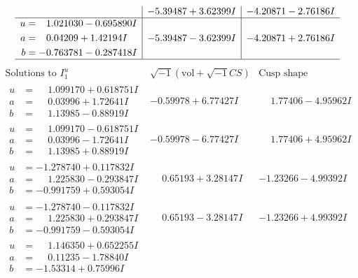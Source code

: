 \documentclass[1p]{elsarticle_modified}
\theoremstyle{definition}
\newcommand{\I}{\sqrt{-1}}
\begin{document}
$$\begin{array}{c|c|c}
 & -5.39487 + 3.62399 I & -4.20871 - 2.76186 I \\ \hline\begin{aligned}
u &= \phantom{-}1.021030 - 0.695890 I \\
a &= \phantom{-}0.04209 + 1.42194 I \\
b &= -0.763781 - 0.287418 I\end{aligned}
 & -5.39487 - 3.62399 I & -4.20871 + 2.76186 I\\
 \hline 
 \end{array}$$\newpage$$\begin{array}{c|c|c}  
\text{Solutions to }I^u_{1}& \I (\text{vol} + \sqrt{-1}CS) & \text{Cusp shape}\\
 \hline 
\begin{aligned}
u &= \phantom{-}1.099170 + 0.618751 I \\
a &= \phantom{-}0.03996 + 1.72641 I \\
b &= \phantom{-}1.13985 - 0.88919 I\end{aligned}
 & -0.59978 + 6.77427 I & \phantom{-}1.77406 - 4.95962 I \\ \hline\begin{aligned}
u &= \phantom{-}1.099170 - 0.618751 I \\
a &= \phantom{-}0.03996 - 1.72641 I \\
b &= \phantom{-}1.13985 + 0.88919 I\end{aligned}
 & -0.59978 - 6.77427 I & \phantom{-}1.77406 + 4.95962 I \\ \hline\begin{aligned}
u &= -1.278740 + 0.117832 I \\
a &= \phantom{-}1.225830 - 0.293847 I \\
b &= -0.991759 + 0.593054 I\end{aligned}
 & \phantom{-}0.65193 + 3.28147 I & -1.23266 - 4.99392 I \\ \hline\begin{aligned}
u &= -1.278740 - 0.117832 I \\
a &= \phantom{-}1.225830 + 0.293847 I \\
b &= -0.991759 - 0.593054 I\end{aligned}
 & \phantom{-}0.65193 - 3.28147 I & -1.23266 + 4.99392 I \\ \hline\begin{aligned}
u &= \phantom{-}1.146350 + 0.652255 I \\
a &= \phantom{-}0.11235 - 1.78840 I \\
b &= -1.53314 + 0.75996 I\end{aligned}

\end{array}$$
\end{document}

